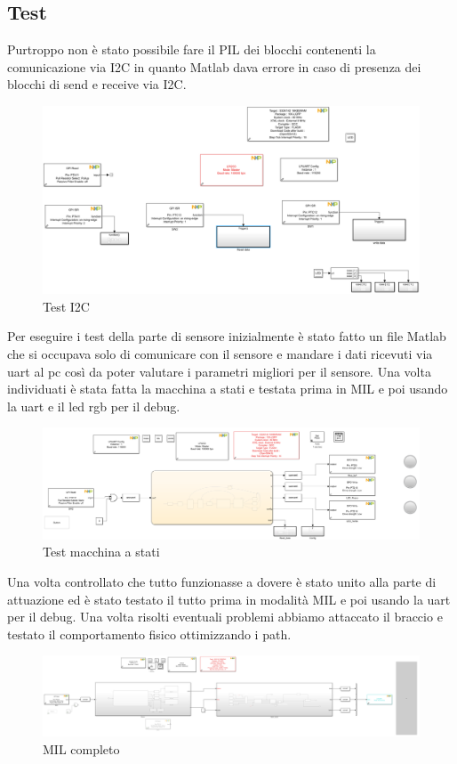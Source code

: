 \documentclass[a4paper,12pt]{report}
\begin{document}
\subsection{Test}
Purtroppo non è stato possibile fare il PIL dei blocchi contenenti la comunicazione via I2C in quanto Matlab dava errore in caso di presenza dei blocchi di send e receive via I2C.
\begin{figure}[h] 
    \centering
    \includegraphics[width=0.6\linewidth]{images/Immagini sensore/i2c_test.png}
    \caption{Test I2C}
\end{figure}
Per eseguire i test della parte di sensore inizialmente è stato fatto un file Matlab che si occupava solo di comunicare con il sensore e mandare i dati ricevuti via uart al pc così da poter valutare i parametri migliori per il sensore.
Una volta individuati è stata fatta la macchina a stati e testata prima in MIL e poi usando la uart e il led rgb per il debug.
\begin{figure}[h] 
    \centering
    \includegraphics[width=0.75\linewidth]{images/Immagini sensore/test_stateflow_2.png}
    \caption{Test macchina a stati}
\end{figure}
Una volta controllato che tutto funzionasse a dovere è stato unito alla parte di attuazione ed è stato testato il tutto prima in modalità MIL e poi usando la uart per il debug. Una volta risolti eventuali problemi abbiamo attaccato il braccio e testato il comportamento fisico ottimizzando i path.
\begin{figure}[h] 
    \centering
    \includegraphics[width=0.75\linewidth]{images/Immagini sensore/Matlab_completo.png}
    \caption{MIL completo}
\end{figure}
\end{document}
